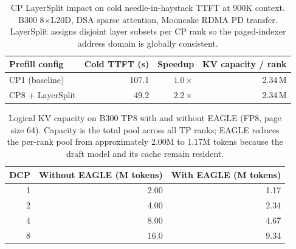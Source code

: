 \begin{table}[H]
\centering
\caption{CP LayerSplit impact on cold needle-in-haystack TTFT at 900K context. B300 8$\times$L20D, DSA sparse attention, Mooncake RDMA PD transfer. LayerSplit assigns disjoint layer subsets per CP rank so the paged-indexer address domain is globally consistent.}
\label{tab:mol_cp_layersplit}
\scriptsize
\begin{tabular}{lrrr}
\toprule
Prefill config & Cold TTFT (s) & Speedup & KV capacity / rank \\
\midrule
CP1 (baseline)       & 107.1 & $1.0\times$ & 2.34\,M \\
CP8 + LayerSplit     & 49.2  & $2.2\times$ & 2.34\,M \\
\bottomrule
\end{tabular}
\end{table}

\begin{table}[H]
\centering
\caption{Logical KV capacity on B300 TP8 with and without EAGLE (FP8, page size 64). Capacity is the total pool across all TP ranks; EAGLE reduces the per-rank pool from approximately 2.00M to 1.17M tokens because the draft model and its cache remain resident.}
\label{tab:mol_dcp_capacity}
\scriptsize
\begin{tabular}{rrr}
\toprule
DCP & Without EAGLE (M tokens) & With EAGLE (M tokens) \\
\midrule
1 & 2.00 & 1.17 \\
2 & 4.00 & 2.34 \\
4 & 8.00 & 4.67 \\
8 & 16.0 & 9.34 \\
\bottomrule
\end{tabular}
\end{table}


